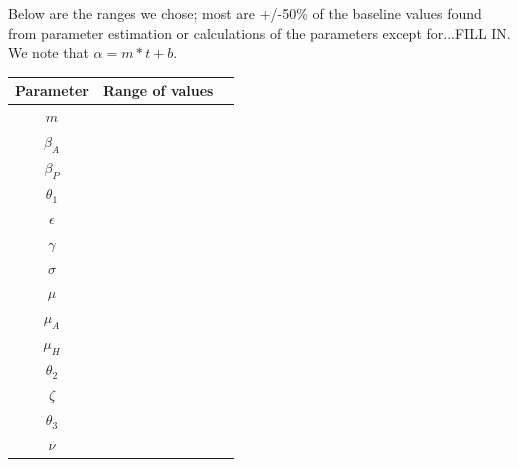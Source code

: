 \documentclass[12pt]{article}
\begin{document}
Below are the ranges we chose; most are +/-50\% of the baseline values found from parameter estimation or calculations of the parameters except for...FILL IN. We note that $\alpha=m*t+b$. 

\begin{center}

\begin{tabular}{|c | c | c|}

 \hline

{Parameter} & {Range of values}  \\ [0.5ex]

 \hline\hline

$m$ &  \\

\hline

$\beta_A$&    \\

\hline

$\beta_P$&    \\

\hline

$\theta_1$&    \\

\hline 

$\epsilon$ &    \\

\hline

$\gamma$ &    \\

\hline


$\sigma$ &    \\

\hline

$\mu$&    \\

\hline

$\mu_A$&    \\

\hline

$\mu_H$&    \\

\hline

$\theta_2$&    \\

\hline

$\zeta$&    \\

\hline

$\theta_3$ &  \\

\hline

$\nu$ &   \\


\end{tabular}
\end{center}
\end{document}
